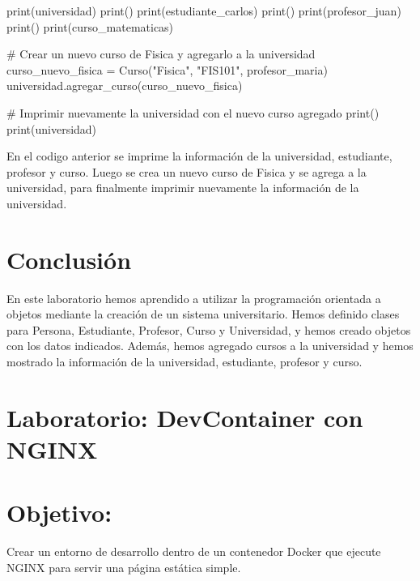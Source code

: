 \documentclass[
  a4paper,
  DIV=11,
  numbers=noendperiod,
  onepage,
  openany]{scrreprt}
\newenvironment{Shaded}{\begin{snugshade}}{\end{snugshade}}
\newcommand{\BuiltInTok}[1]{\textcolor[rgb]{0.00,0.23,0.31}{#1}}
\newcommand{\CommentTok}[1]{\textcolor[rgb]{0.37,0.37,0.37}{#1}}
\newcommand{\NormalTok}[1]{\textcolor[rgb]{0.00,0.23,0.31}{#1}}
\newcommand{\OperatorTok}[1]{\textcolor[rgb]{0.37,0.37,0.37}{#1}}
\newcommand{\StringTok}[1]{\textcolor[rgb]{0.13,0.47,0.30}{#1}}
\begin{document}
\begin{Shaded}
\begin{Highlighting}[]
\BuiltInTok{print}\NormalTok{(universidad)}
\BuiltInTok{print}\NormalTok{()}
\BuiltInTok{print}\NormalTok{(estudiante\_carlos)}
\BuiltInTok{print}\NormalTok{()}
\BuiltInTok{print}\NormalTok{(profesor\_juan)}
\BuiltInTok{print}\NormalTok{()}
\BuiltInTok{print}\NormalTok{(curso\_matematicas)}

\CommentTok{\# Crear un nuevo curso de Fisica y agregarlo a la universidad}
\NormalTok{curso\_nuevo\_fisica }\OperatorTok{=}\NormalTok{ Curso(}\StringTok{"Fisica"}\NormalTok{, }\StringTok{"FIS101"}\NormalTok{, profesor\_maria)}
\NormalTok{universidad.agregar\_curso(curso\_nuevo\_fisica)}

\CommentTok{\# Imprimir nuevamente la universidad con el nuevo curso agregado}
\BuiltInTok{print}\NormalTok{()}
\BuiltInTok{print}\NormalTok{(universidad)}
\end{Highlighting}
\end{Shaded}

En el codigo anterior se imprime la información de la universidad,
estudiante, profesor y curso. Luego se crea un nuevo curso de Fisica y
se agrega a la universidad, para finalmente imprimir nuevamente la
información de la universidad.

\chapter{Conclusión}\label{conclusiuxf3n-7}

En este laboratorio hemos aprendido a utilizar la programación orientada
a objetos mediante la creación de un sistema universitario. Hemos
definido clases para Persona, Estudiante, Profesor, Curso y Universidad,
y hemos creado objetos con los datos indicados. Además, hemos agregado
cursos a la universidad y hemos mostrado la información de la
universidad, estudiante, profesor y curso.

\chapter{Laboratorio: DevContainer con
NGINX}\label{laboratorio-devcontainer-con-nginx}

\chapter{Objetivo:}\label{objetivo}

Crear un entorno de desarrollo dentro de un contenedor Docker que
ejecute NGINX para servir una página estática simple.
\end{document}
